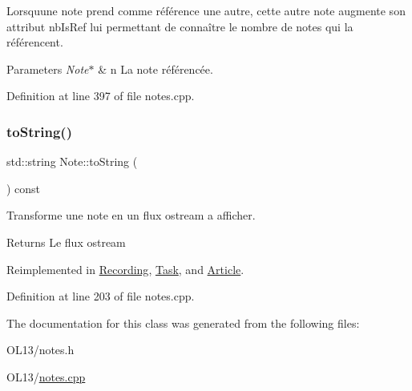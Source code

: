 Lorsqu\textquotesingle{}une note prend comme référence une autre, cette autre note augmente son attribut nb\+Is\+Ref lui permettant de connaître le nombre de notes qui la référencent. 
\begin{DoxyParams}{Parameters}
{\em Note$\ast$} & n La note référencée. \\
\hline
\end{DoxyParams}


Definition at line 397 of file notes.\+cpp.

\mbox{\label{class_note_a1bd4acfbde0b71d05fd7d4ca889bca2b}} 
\subsubsection{\texorpdfstring{to\+String()}{toString()}}
{\footnotesize\ttfamily std\+::string Note\+::to\+String (\begin{DoxyParamCaption}{ }\end{DoxyParamCaption}) const\hspace{0.3cm}{\ttfamily [virtual]}}



Transforme une note en un flux ostream a afficher. 

\begin{DoxyReturn}{Returns}
Le flux ostream 
\end{DoxyReturn}


Reimplemented in \hyperlink{class_recording_a9f403a39bec2db40c9171a6c3a20942d}{Recording}, \hyperlink{class_task_a7fe5cb7b57a21693e7abfea2f9618563}{Task}, and \hyperlink{class_article_ae40d268ecffbaaa549968a81ea609ba4}{Article}.



Definition at line 203 of file notes.\+cpp.



The documentation for this class was generated from the following files\+:\begin{DoxyCompactItemize}
\item 
O\+L13/notes.\+h\item 
O\+L13/\hyperlink{notes_8cpp}{notes.\+cpp}\end{DoxyCompactItemize}
